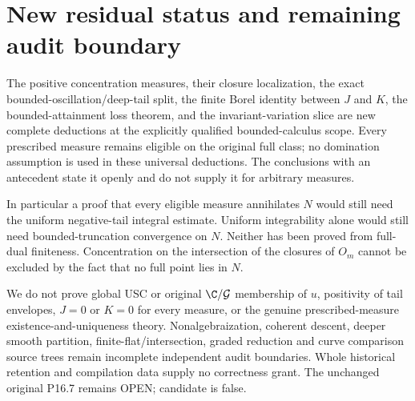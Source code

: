 \section{New residual status and remaining audit boundary}
The positive concentration measures, their closure localization,
the exact bounded-oscillation/deep-tail split, the finite Borel identity
between $J$ and $K$, the bounded-attainment loss theorem, and the
invariant-variation slice are new complete deductions at the explicitly
qualified bounded-calculus scope. Every prescribed measure remains
eligible on the original full class; no domination assumption is used
in these universal deductions. The conclusions with an antecedent
state it openly and do not supply it for arbitrary measures.

In particular a proof that every eligible measure annihilates $N$
would still need the uniform negative-tail integral estimate. Uniform
integrability alone would still need bounded-truncation convergence on
$N$. Neither has been proved from full-dual finiteness. Concentration
on the intersection of the closures of $O_m$ cannot be excluded by
the fact that no full point lies in $N$.

We do not prove global USC or original $\C/\mathcal G$ membership
of $u$, positivity of tail envelopes, $J=0$ or $K=0$ for every
measure, or the genuine prescribed-measure existence-and-uniqueness
theory. Nonalgebraization, coherent descent, deeper smooth partition,
finite-flat/intersection, graded reduction and curve comparison source
trees remain incomplete independent audit boundaries. Whole historical
retention and compilation data supply no correctness grant. The
unchanged original P16.7 remains OPEN; candidate is false.
